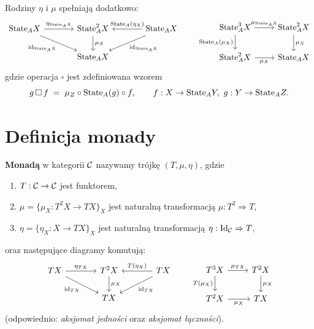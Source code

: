 \begin{uwaga}
Rodziny $\eta$ i $\mu$ spełniają dodatkowo:
\[
\begin{tikzcd}[column sep=large]
\State_A X \arrow[r, "\eta_{\State_A X}"] \arrow[dr, "\id_{\State_A X}"'] & \State_A^2 X \arrow[d, "\mu_X"] & \State_A X \arrow[l, "\State_A(\eta_X)"'] \arrow[dl, "\id_{\State_A X}"] \\
& \State_A X &
\end{tikzcd}
\qquad
\begin{tikzcd}
\State_A^3 X \arrow[r, "\mu_{\State_A X}"] \arrow[d, "\State_A(\mu_X)"'] & \State_A^2 X \arrow[d, "\mu_X"] \\
\State_A^2 X \arrow[r, "\mu_X"'] & \State_A X
\end{tikzcd}
\]
gdzie operacja $\square$ jest zdefiniowana wzorem
\[
g \,\square\, f \;=\; \mu_Z \circ \mathrm{State}_A(g) \circ f, \qquad f : X \to \mathrm{State}_A Y,\ g : Y \to \mathrm{State}_A Z.
\]
\end{uwaga}

\section{Definicja monady}

\begin{definicja}
\textbf{Monadą} w kategorii $\mathcal{C}$ nazywamy trójkę $(T, \mu, \eta)$, gdzie
\begin{enumerate}
\item $T : \mathcal{C} \to \mathcal{C}$ jest funktorem,
\item $\mu = \{\mu_X : T^2 X \to T X\}_X$ jest naturalną transformacją $\mu : T^2 \Rightarrow T$,
\item $\eta = \{\eta_X : X \to T X\}_X$ jest naturalną transformacją $\eta : \mathrm{Id}_{\mathcal{C}} \Rightarrow T$,
\end{enumerate}
oraz następujące diagramy komutują:
\[
\begin{tikzcd}[column sep=large]
T X \arrow[r, "\eta_{T X}"] \arrow[dr, "\id_{T X}"'] & T^2 X \arrow[d, "\mu_X"] & T X \arrow[l, "T(\eta_X)"'] \arrow[dl, "\id_{T X}"] \\
& T X &
\end{tikzcd}
\qquad
\begin{tikzcd}
T^3 X \arrow[r, "\mu_{T X}"] \arrow[d, "T(\mu_X)"'] & T^2 X \arrow[d, "\mu_X"] \\
T^2 X \arrow[r, "\mu_X"'] & T X
\end{tikzcd}
\]
(odpowiednio: \emph{aksjomat jedności} oraz \emph{aksjomat łączności}).
\end{definicja}

